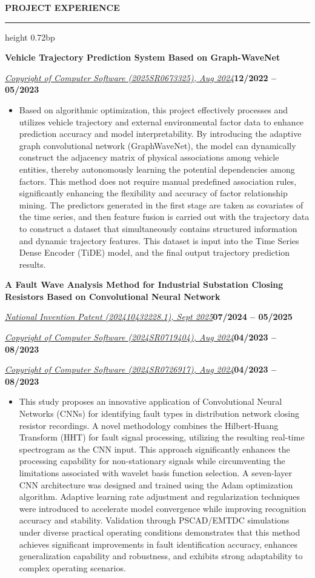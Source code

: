 \documentclass[10pt,a4paper]{article}
\newcommand{\compactsectionrule}[1]{%
  \par\vspace{0.24bp}\noindent\textbf{#1}\par\vspace{2.62bp}%
  \hrule height 0.72bp\vspace{0.66bp}%
}
\newcommand{\titleline}[1]{\par\noindent\textbf{#1}\par}
\newcommand{\venueline}[2]{\par\noindent\uline{\textit{#1}}\hfill\textbf{#2}\par}
\newenvironment{cvitems}{%
  \begin{itemize}[leftmargin=14.20bp,labelwidth=4.20bp,labelsep=10.00bp,align=left,
    topsep=0bp,itemsep=0bp,parsep=0bp,partopsep=0bp,label={\textbullet}]
}{\end{itemize}}
\begin{document}
\vspace{2.16bp}\compactsectionrule{PROJECT EXPERIENCE}
\titleline{Vehicle Trajectory Prediction System Based on Graph-WaveNet}
\venueline{Copyright of Computer Software (2025SR0673325), Aug 2024}{12/2022 -- 05/2023}
\begin{cvitems}
\item Based on algorithmic optimization, this project effectively processes and utilizes vehicle trajectory and external environmental factor data to enhance prediction accuracy and model interpretability. By introducing the adaptive graph convolutional network (GraphWaveNet), the model can dynamically construct the adjacency matrix of physical associations among vehicle entities, thereby autonomously learning the potential dependencies among factors. This method does not require manual predefined association rules, significantly enhancing the flexibility and accuracy of factor relationship mining. The predictors generated in the first stage are taken as covariates of the time series, and then feature fusion is carried out with the trajectory data to construct a dataset that simultaneously contains structured information and dynamic trajectory features. This dataset is input into the Time Series Dense Encoder (TiDE) model, and the final output trajectory prediction results.
\end{cvitems}

\titleline{A Fault Wave Analysis Method for Industrial Substation Closing Resistors Based on Convolutional Neural Network}
\venueline{National Invention Patent (202410432228.1), Sept 2025}{07/2024 -- 05/2025}
\venueline{Copyright of Computer Software (2024SR0719404), Aug 2024}{04/2023 -- 08/2023}
\venueline{Copyright of Computer Software (2024SR0726917), Aug 2024}{04/2023 -- 08/2023}
\begin{cvitems}
\item This study proposes an innovative application of Convolutional Neural Networks (CNNs) for identifying fault types in distribution network closing resistor recordings. A novel methodology combines the Hilbert-Huang Transform (HHT) for fault signal processing, utilizing the resulting real-time spectrogram as the CNN input. This approach significantly enhances the processing capability for non-stationary signals while circumventing the limitations associated with wavelet basis function selection. A seven-layer CNN architecture was designed and trained using the Adam optimization algorithm. Adaptive learning rate adjustment and regularization techniques were introduced to accelerate model convergence while improving recognition accuracy and stability. Validation through PSCAD/EMTDC simulations under diverse practical operating conditions demonstrates that this method achieves significant improvements in fault identification accuracy, enhances generalization capability and robustness, and exhibits strong adaptability to complex operating scenarios.
\end{cvitems}
\end{document}
